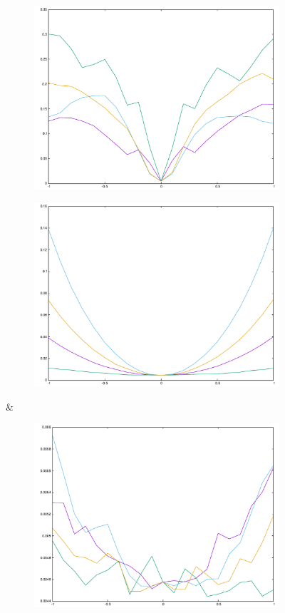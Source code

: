 \begin{figure}[H]
\begin{subfigure}{.33\textwidth}
	\includegraphics[width=\linewidth]{fig/ajherr/t3/L_chi.pdf}
\end{subfigure}%
\begin{subfigure}{.33\textwidth}
	\includegraphics[width=\linewidth]{fig/ajherr/t3/M_chi.pdf}
\end{subfigure}&
\begin{subfigure}{.33\textwidth}
	\includegraphics[width=\linewidth]{fig/ajherr/t3/S_chi.pdf}

\end{subfigure}
\end{figure}
